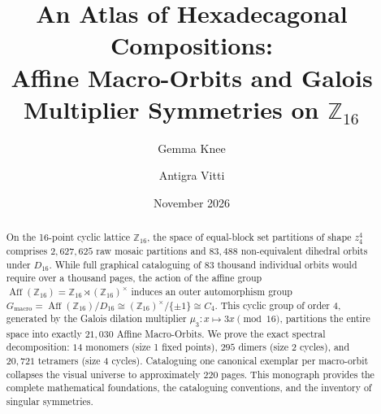 \documentclass[11pt,a4paper]{article}
\title{\textbf{An Atlas of Hexadecagonal Compositions:}\\ Affine Macro-Orbits and Galois Multiplier Symmetries on \texorpdfstring{$\mathbb{Z}_{16}$}{Z16}}
\author{Gemma Knee \and Antigra Vitti}
\date{November 2026}
\theoremstyle{breakthm}
\theoremstyle{breakdef}
\numberwithin{equation}{section}
\begin{document}
\maketitle

\begin{abstract}
On the 16-point cyclic lattice $\mathbb{Z}_{16}$, the space of equal-block set partitions of shape $z_4^4$ comprises $2{,}627{,}625$ raw mosaic partitions and $83{,}488$ non-equivalent dihedral orbits under $D_{16}$. While full graphical cataloguing of 83 thousand individual orbits would require over a thousand pages, the action of the affine group $\operatorname{Aff}(\mathbb{Z}_{16}) = \mathbb{Z}_{16} \rtimes (\mathbb{Z}_{16})^\times$ induces an outer automorphism group $G_{\text{macro}} = \operatorname{Aff}(\mathbb{Z}_{16}) / D_{16} \cong (\mathbb{Z}_{16})^\times / \{\pm 1\} \cong C_4$. This cyclic group of order 4, generated by the Galois dilation multiplier $\mu_3 \colon x \mapsto 3x \pmod{16}$, partitions the entire space into exactly $21{,}030$ Affine Macro-Orbits. We prove the exact spectral decomposition: $14$ monomers (size 1 fixed points), $295$ dimers (size 2 cycles), and $20{,}721$ tetramers (size 4 cycles). Cataloguing one canonical exemplar per macro-orbit collapses the visual universe to approximately $220$ pages. This monograph provides the complete mathematical foundations, the cataloguing conventions, and the inventory of singular symmetries.
\end{abstract}

\tableofcontents
\newpage






\appendix




\FloatBarrier


\end{document}
